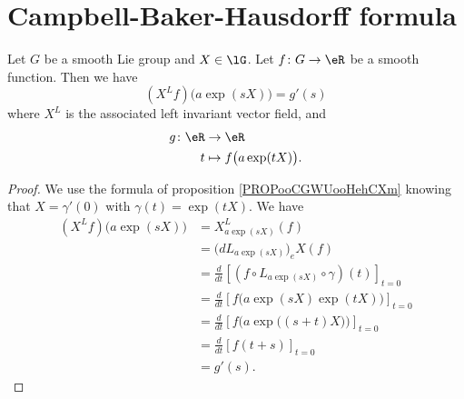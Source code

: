 \section{Campbell-Baker-Hausdorff formula}


\begin{proposition}	\label{PROPooNEIHooWQctei}
	Let \( G\) be a smooth Lie group and \( X\in\lG\). Let \(f \colon G\to \eR  \) be a smooth function. Then we have
	\begin{equation}
		(X^Lf)\big( a\exp(sX) \big)=g'(s)
	\end{equation}
	where \( X^L\) is the associated left invariant vector field, and
	\begin{equation}
		\begin{aligned}
			g\colon \eR & \to \eR                         \\
			t           & \mapsto f\big( a\exp(tX) \big).
		\end{aligned}
	\end{equation}
\end{proposition}

\begin{proof}
	We use the formula of proposition \ref{PROPooCGWUooHehCXm} knowing that \( X=\gamma'(0)\) with \( \gamma(t)=\exp(tX)\). We have
	\begin{subequations}
		\begin{align}
			(X^Lf)\big( a\exp(sX) \big) & =X^L_{a\exp(sX)}(f)                                                       \\
			                            & =\big( dL_{a\exp(sX)} \big)_eX(f)                                         \\
			                            & =\frac{d}{dt} \left[ (f\circ L_{a\exp(sX)}\circ \gamma)(t)  \right]_{t=0} \\
			                            & =\frac{d}{dt} \left[ f\big( a\exp(sX)\exp(tX) \big)  \right]_{t=0}        \\
			                            & =\frac{d}{dt} \left[ f\Big( a\exp\big( (s+t)X \big) \Big)  \right]_{t=0}  \\
			                            & =\frac{d}{dt} \left[ f(t+s)  \right]_{t=0}                                \\
			                            & =g'(s).
		\end{align}
	\end{subequations}
\end{proof}

